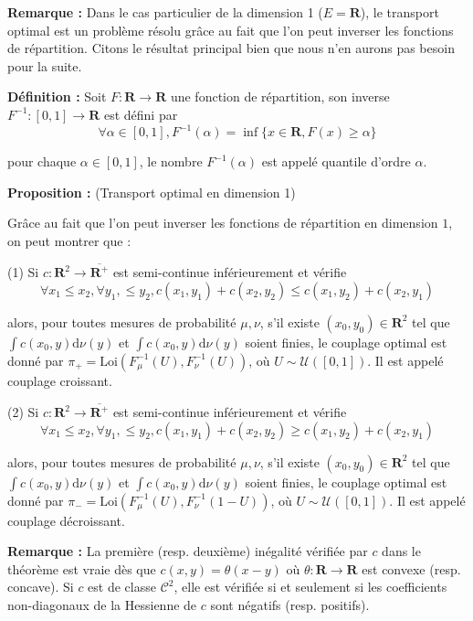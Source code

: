 \documentclass[12pt]{article}
\begin{document}
\textbf{Remarque :} Dans le cas particulier de la dimension 1 ($E = \mathbf R$), le transport optimal est un problème résolu grâce au fait que l'on peut inverser les fonctions de répartition. Citons le résultat principal bien que nous n'en aurons pas besoin pour la suite.

\textbf{Définition :} Soit $ F : \mathbf R \to \mathbf R $ une fonction de répartition, son \og inverse \fg\, $ F^{-1} : [0,1] \to \mathbf R$ est défini par 
$$ \forall \alpha \in [0,1], F^{-1}(\alpha) = \inf \{x \in \mathbf R, F(x) \geqslant \alpha \} $$

pour chaque $ \alpha \in [0,1]$, le nombre $F^{-1}(\alpha)$ est appelé quantile d'ordre $ \alpha $.

\textbf{Proposition : } (Transport optimal en dimension 1)

Grâce au fait que l'on peut inverser les fonctions de répartition en dimension $1$, on peut montrer que :

(1) Si $ c : \mathbf R^2 \to \overline{\mathbf R^+} $ est semi-continue inférieurement et vérifie $$ \forall x_1 \leqslant x_2, \forall y_1, \leqslant y_2, c(x_1,y_1) + c(x_2,y_2) \leqslant c(x_1,y_2) + c(x_2,y_1) $$

alors, pour toutes mesures de probabilité $ \mu, \nu $, s'il existe $(x_0,y_0) \in \mathbf R^2$ tel que $ \displaystyle \int c(x_0,y) \mathrm d \nu(y) $ et $ \displaystyle \int c(x_0,y) \mathrm d \nu(y) $ soient finies, le couplage optimal est donné par $ \pi_+ = \mathrm{Loi}(F_\mu^{-1}(U),F_\nu^{-1}(U))$, où $ U \sim \mathcal U([0,1]) $. Il est appelé couplage croissant.

(2) Si $ c : \mathbf R^2 \to \overline{\mathbf R^+} $ est semi-continue inférieurement et vérifie $$ \forall x_1 \leqslant x_2, \forall y_1, \leqslant y_2, c(x_1,y_1) + c(x_2,y_2) \geqslant c(x_1,y_2) + c(x_2,y_1) $$

alors, pour toutes mesures de probabilité $ \mu, \nu $, s'il existe $(x_0,y_0) \in \mathbf R^2$ tel que $ \displaystyle \int c(x_0,y) \mathrm d \nu(y) $ et $ \displaystyle \int c(x_0,y) \mathrm d \nu(y) $ soient finies, le couplage optimal est donné par $ \pi_- = \mathrm{Loi}(F_\mu^{-1}(U),F_\nu^{-1}(1-U))$, où $ U \sim \mathcal U([0,1]) $. Il est appelé couplage décroissant.

\textbf{Remarque :} La première (resp. deuxième) inégalité vérifiée par $c$ dans le théorème est vraie dès que $c(x,y) = \theta(x-y) $ où $ \theta : \mathbf R \to \mathbf R $ est convexe (resp. concave). Si $c$ est de classe $ \mathcal C^2 $, elle est vérifiée si et seulement si les coefficients non-diagonaux de la Hessienne de $c$ sont négatifs (resp. positifs).
\end{document}
